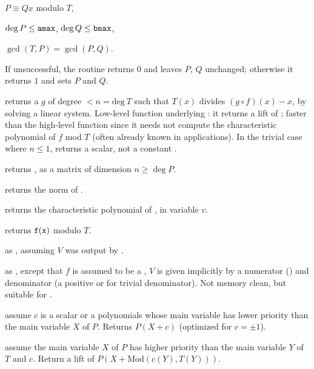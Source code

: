 \item $P \equiv Q x$ modulo $T$,

\item $\deg P \leq {\tt amax}$, $\deg Q \leq {\tt bmax}$,

\item $\gcd(T,P) = \gcd(P,Q)$.

\noindent If unsuccessful, the routine returns $0$ and leaves $P$, $Q$
unchanged; otherwise it returns $1$ and sets $P$ and $Q$.

 returns a  $g$ of degree $< n
= \text{deg}~T$ such that $T(x)$ divides $(g \circ f)(x) - x$, by solving a
linear system. Low-level function underlying : it returns a
lift of \kbd[modreverse(f,T)]; faster than the high-level function since it
needs not compute the characteristic polynomial of $f$ mod $T$ (often already
known in applications). In the trivial case where $n \leq 1$, returns a
scalar, not a constant .

 returns
, as a matrix of dimension $n \geq \deg P$.

 returns the norm of .

 returns the characteristic
polynomial of , in variable $v$.

 returns ${\tt f}({\tt x})$ modulo
$T$.

 as ,
assuming $V$ was output by .

 as ,
except that $f$ is assumed to be a , $V$ is given implicitly
by a numerator  () and denominator  (a positive
 or  for trivial denominator). Not memory clean, but
suitable for .

 assume $c$ is a scalar or
a polynomials whose main variable has lower priority than the main variable
$X$ of $P$. Returns $P(X + c)$ (optimized for $c = \pm 1$).

 assume the main variable
$X$ of $P$ has higher priority than the main variable $Y$ of $T$ and $c$.
Return a lift of $P(X+\text{Mod}(c(Y), T(Y)))$.

